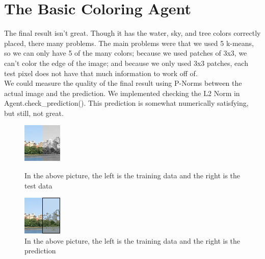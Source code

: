 \documentclass[12pt]{report}
\begin{document}
\section*{The Basic Coloring Agent}
The final result isn't great. Though it has the water, sky, and tree colors correctly placed, there many problems. The main problems were that we used 5 k-means, so we can only have 5 of the many colors; because we used patches of 3x3, we can't color the edge of the image; and because we only used 3x3 patches, each test pixel does not have that much information to work off of.\\
We could measure the quality of the final result using P-Norms between the actual image and the prediction. We implemented checking the L2 Norm in Agent.check\_prediction(). This prediction is somewhat numerically satisfying, but still, not great.
\begin{figure}[t]
\includegraphics[width=.5\textwidth]{Test Image}
\caption{In the above picture, the left is the training data and the right is the test data}
\includegraphics[width=.5\textwidth]{Basic Agent Prediction}
\caption{In the above picture, the left is the training data and the right is the prediction}
\end{figure}
\vfill
\clearpage
\end{document}
